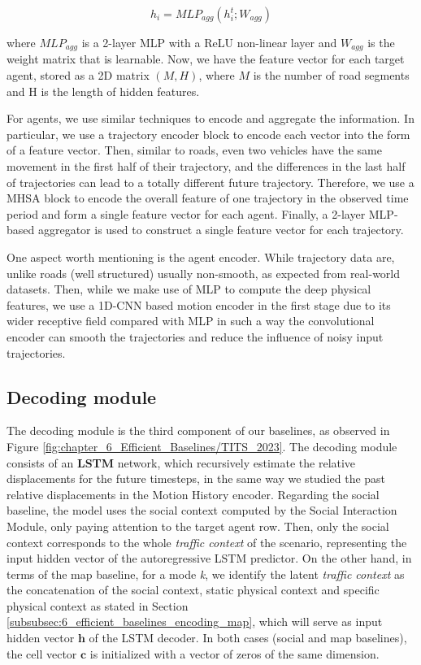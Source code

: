 \begin{equation}
	h_i=MLP_{a g g}\left(h_i^t ; W_{a g g}\right)
\end{equation}

where $MLP_{a g g}$ is a 2-layer MLP with a ReLU non-linear layer and $W_{a g g}$ is the weight matrix that is learnable. Now, we have the feature vector for each target agent, stored as a 2D matrix $(M, H)$, where $M$ is the number of road segments and $\mathrm{H}$ is the length of hidden features. 

For agents, we use similar techniques to encode and aggregate the information. In particular, we use a trajectory encoder block to encode each vector into the form of a feature vector. Then, similar to roads, even two vehicles have the same movement in the first half of their trajectory, and the differences in the last half of trajectories can lead to a totally different future trajectory. Therefore, we use a MHSA block to encode the overall feature of one trajectory in the observed time period and form a single feature vector for each agent. Finally, a 2-layer MLP-based aggregator is used to construct a single feature vector for each trajectory.

One aspect worth mentioning is the agent encoder. While trajectory data are, unlike roads (well structured) usually non-smooth, as expected from real-world datasets. Then, while we make use of MLP to compute the deep physical features, we use a 1D-CNN based motion encoder in the first stage due to its wider receptive field compared with MLP in such a way the convolutional encoder can smooth the trajectories and reduce the influence of noisy input trajectories.

\subsection{Decoding module}
\label{subsubsec:6_efficient_baselines_decoding_modules}

The decoding module is the third component of our baselines, as observed in Figure \ref{fig:chapter_6_Efficient_Baselines/TITS_2023}. The decoding module consists of an \textbf{LSTM} network, which recursively estimate the relative displacements for the future timesteps, in the same way we studied the past relative displacements in the Motion History encoder. Regarding the social baseline, the model uses the social context computed by the Social Interaction Module, only paying attention to the target agent row. Then, only the social context corresponds to the whole \textit{traffic context} of the scenario, representing the input hidden vector of the autoregressive LSTM predictor. On the other hand, in terms of the map baseline, for a mode \textit{k}, we identify the latent \textit{traffic context} as the concatenation of the social context, static physical context and specific physical context as stated in Section \ref{subsubsec:6_efficient_baselines_encoding_map}, which will serve as input hidden vector $\mathbf{h}$ of the LSTM decoder. In both cases (social and map baselines), the cell vector $\mathbf{c}$ is initialized with a vector of zeros of the same dimension. 

